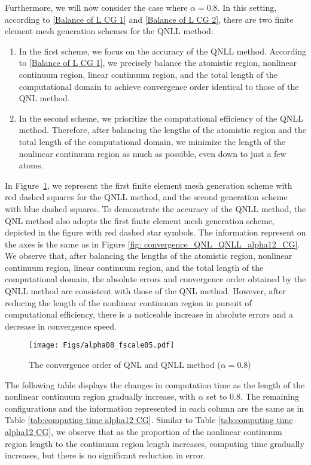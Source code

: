 Furthermore, we will now consider the case where $\alpha=0.8$. In this setting, according to \eqref{Balance of L CG 1} and \eqref{Balance of L CG 2}, there are two finite element mesh generation schemes for the QNLL method:
\begin{enumerate}
	\item In the first scheme, we focus on the accuracy of the QNLL method. According to \eqref{Balance of L CG 1}, we precisely balance the atomistic region, nonlinear continuum region, linear continuum region, and the total length of the computational domain to achieve convergence order identical to those of the QNL method.
	
	\item In the second scheme, we prioritize the computational efficiency of the QNLL method. Therefore, after balancing the lengths of the atomistic region and the total length of the computational domain, we minimize the length of the nonlinear continuum region as much as possible, even down to just a few atoms.
\end{enumerate}

In Figure~\ref{fig: convergence_QNL_QNLL_alpha08_CG}, we represent the first finite element mesh generation scheme with red dashed squares for the QNLL method, and the second generation scheme with blue dashed squares. To demonstrate the accuracy of the QNLL method, the QNL method also adopts the first finite element mesh generation scheme, depicted in the figure with red dashed star symbols. The information represent on the axes is the same as in Figure \ref{fig: convergence_QNL_QNLL_alpha12_CG}. We observe that, after balancing the lengths of the atomistic region, nonlinear continuum region, linear continuum region, and the total length of the computational domain, the absolute errors and convergence order obtained by the QNLL method are consistent with those of the QNL method. However, after reducing the length of the nonlinear continuum region in pursuit of computational efficiency, there is a noticeable increase in absolute errors and a decrease in convergence speed.

\begin{figure}
	\centering 
	\texttt{[image: Figs/alpha08\_fscale05.pdf]}
	\caption{The convergence order of QNL and QNLL method ($\alpha = 0.8$)} %
	\label{fig: convergence_QNL_QNLL_alpha08_CG}
\end{figure}

The following table displays the changes in computation time as the length of the nonlinear continuum region gradually increase, with $\alpha$ set to 0.8. The remaining configurations and the information represented in each column are the same as in Table \ref{tab:computing time alpha12 CG}. Similar to Table \ref{tab:computing time alpha12 CG}, we observe that as the proportion of the nonlinear continuum region length to the continuum region length increases, computing time gradually increases, but there is no significant reduction in error.

